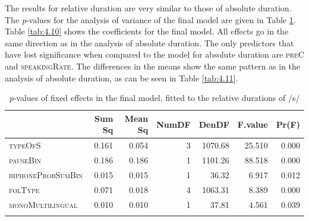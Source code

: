 The results for relative duration are very similar to those of absolute duration. The \textit{p}-values for the analysis of variance of the final model are given in Table \ref{tab:4.9}. Table \ref{tab:4.10} shows the coefficients for the final model. All effects go in the same direction as in the analysis of absolute duration. The only predictors that have lost significance when compared to the model for absolute duration are \textsc{preC} and \textsc{speakingRate}. The differences in the means show the same pattern as in the analysis of absolute duration, as can be seen in Table \ref{tab:4.11}.

\begin{table}\fontsize{10}{11}
\caption{\textit{p}-values of fixed effects in the final model, fitted to the relative durations of /s/}
\label{tab:4.9}
\centering
\begin{tabular}{lrrrrrr} 
\lsptoprule
~                 & Sum Sq & Mean Sq & NumDF & DenDF   & F.value & Pr(F)  \\ 
\midrule
\textsc{typeOfS}           & 0.161  & 0.054   & 3     & 1070.68 & 25.510  & 0.000  \\
\textsc{pauseBin}          & 0.186  & 0.186   & 1     & 1101.26 & 88.518  & 0.000  \\
\textsc{biphoneProbSumBin} & 0.015  & 0.015   & 1     & 36.32   & 6.917   & 0.012  \\
\textsc{folType}           & 0.071  & 0.018   & 4     & 1063.31 & 8.389   & 0.000  \\
\textsc{monoMultilingual}  & 0.010  & 0.010   & 1     & 37.81   & 4.561   & 0.039  \\
\lspbottomrule
\end{tabular}
\end{table}




